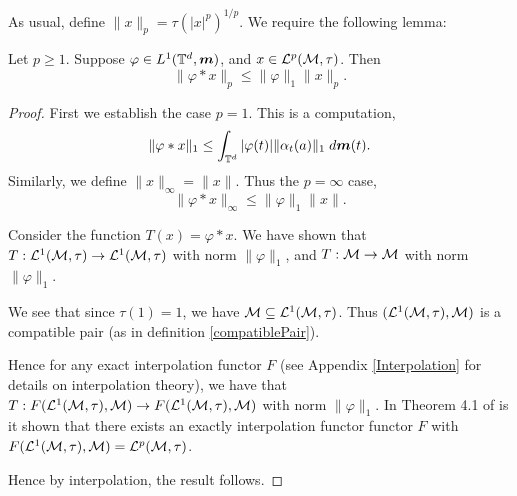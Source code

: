 As usual, define $\|x\|_p = \tau(|x|^p)^{1/p}$. We require the following lemma:
\begin{lemma}
    Let $p \geq 1$. Suppose $\varphi \in L^1(\mathbb{T}^d,\boldsymbol{m})$, and $x \in \mathcal{L}^p(\mathcal{M},\tau)$. Then
    \begin{equation}
        \|\varphi*x\|_p \leq \|\varphi\|_1\|x\|_p.
    \end{equation}
\end{lemma} 
\begin{proof}
    First we establish the case $p  =  1$. This is a computation,
    \begin{equation}
        \|\varphi * x\|_1 \leq \int_{\mathbb{T}^d} |\varphi(t)|\|\alpha_{t}(a)\|_1\;d\boldsymbol{m}(t).
    \end{equation}
    Similarly, we define $\|x\|_\infty = \|x\|$. Thus the $p = \infty$ case,
    \begin{equation}
        \|\varphi*x\|_\infty \leq \|\varphi\|_1\|x\|.
    \end{equation}
    
    Consider the function $T(x) = \varphi * x$. We
    have shown that $T:\mathcal{L}^1(\mathcal{M},\tau)\to\mathcal{L}^1(\mathcal{M},\tau)$
    with norm $\|\varphi\|_1$, and $T:\mathcal{M}\to \mathcal{M}$ with norm $\|\varphi\|_1$.
    
    We see that since $\tau(1) = 1$, we have $\mathcal{M} \subseteq \mathcal{L}^1(\mathcal{M},\tau)$.
    Thus $(\mathcal{L}^1(\mathcal{M},\tau),\mathcal{M})$ is a compatible pair (as in definition \ref{compatiblePair}).
    
    Hence for any exact interpolation functor $F$ (see Appendix \ref{Interpolation}
    for details on interpolation theory),
    we have that $T:F(\mathcal{L}^1(\mathcal{M},\tau),\mathcal{M})\to F(\mathcal{L}^1(\mathcal{M},\tau),\mathcal{M})$
    with norm $\|\varphi\|_1$. In Theorem 4.1 of \cite{DDP92} is it shown that there exists
    an exactly interpolation functor  functor $F$ with $F(\mathcal{L}^1(\mathcal{M},\tau),\mathcal{M}) = \mathcal{L}^p(\mathcal{M},\tau)$.
    
    Hence by interpolation, the result follows.
\end{proof} 


